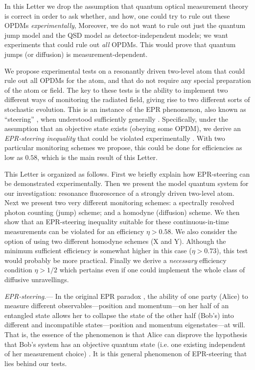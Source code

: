 \documentclass[12pt,prl,floatfix,showpacs,superscriptaddress,amsmath,amssymb]{revtex4}
\renewcommand{\(}{\left(}
\renewcommand{\)}{\right)}
\renewcommand{\section}[1]{{\em #1}.---}
\begin{document}
In this Letter we drop the assumption that quantum optical measurement theory is correct in order 
to ask whether, and how, one could try to rule out these OPDMs {\em experimentally}, 
Moreover, we do not want to rule out just the quantum jump model and the QSD 
model as detector-independent models; we want experiments that could rule out {\em all} OPDMs. 
This would prove that quantum jumps (or diffusion) is measurement-dependent.

We propose experimental tests on a resonantly driven two-level atom that could rule out all OPDMs for the atom, 
and that do not require any special preparation of the atom or field. The key to these tests is the ability to implement two different ways of monitoring the radiated field, giving rise to two different sorts of stochastic evolution. This is an instance of the EPR phenomenon, also known as ``steering'' \cite{SchPCP35}, when understood sufficiently generally \cite{WisJonDoh07}. Specifically, under the assumption that an objective state exists (obeying some OPDM), we derive an {\em EPR-steering inequality} \cite{CavJonWisRei09} that could be violated experimentally \cite{SJWP10,Smi12}. With two particular monitoring schemes we propose, this could be done for efficiencies as low as $0.58$, which is the main result of this Letter.  

This Letter is organized as follows. First we briefly explain how EPR-steering can be demonstrated experimentally. 
Then we present the model quantum system for our investigation: resonance fluorescence of a strongly driven two-level atom. Next we present two very different monitoring schemes: a spectrally resolved photon counting (jump) scheme; 
and a homodyne (diffusion) scheme. 
We then show that an EPR-steering inequality suitable for these continuous-in-time measurements can be violated for an efficiency $\eta>0.58$. We also consider the  
option of using two different homodyne schemes (X and Y). Although the minimum sufficient efficiency is somewhat higher 
in this case ($\eta>0.73$), this test would probably be more practical. Finally we derive a {\em necessary} efficiency condition $\eta > 1/2$
 which pertains even if one could implement the whole class of diffusive unravellings.  
 
\section{EPR-steering} 
In the original EPR paradox \cite{EPR35}, the ability of one party (Alice) to measure different 
observables---position and  momentum---on her half of an entangled state allows her 
to collapse the state of the other half (Bob's) into different and 
incompatible states---position and momentum eigenstates---at will. That is, the essence of the phenomenon
is that Alice can disprove the hypothesis that Bob's system has an objective quantum state (i.e. one 
existing independent of her measurement choice) \cite{WisJonDoh07}. It is this general 
phenomenon of EPR-steering  that lies behind our tests. 
\end{document}
